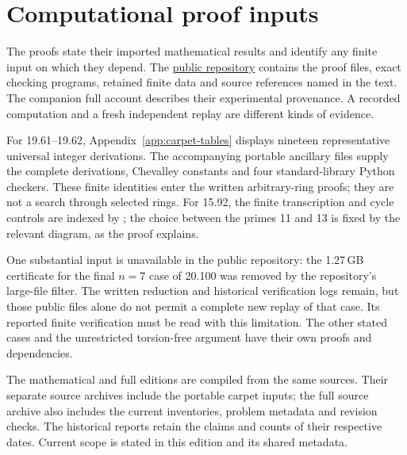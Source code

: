 \section{Computational proof inputs}
\label{app:math-artifacts}
The proofs state their imported mathematical results and identify any
finite input on which they depend. The
\href{https://github.com/JUrban/kour1}{public repository} contains the
proof files, exact checking programs, retained finite data and source
references named in the text. The companion full account describes
their experimental provenance. A recorded computation and a fresh
independent replay are different kinds of evidence.

For 19.61--19.62, Appendix~\ref{app:carpet-tables} displays nineteen
representative universal integer derivations. The accompanying portable
ancillary files supply the complete derivations, Chevalley constants and
four standard-library Python checkers. These finite identities enter the
written arbitrary-ring proofs; they are not a search through selected rings.
For 15.92, the finite transcription and cycle controls are indexed by
; the choice between the primes
11 and 13 is fixed by the relevant diagram, as the proof explains.

One substantial input is unavailable in the public repository: the
1.27\,GB certificate for the final $n=7$ case of 20.100 was removed by
the repository's large-file filter. The written reduction and historical
verification logs remain, but those public files alone do not permit a
complete new replay of that case. Its reported finite verification must
be read with this limitation. The other stated cases and the unrestricted
torsion-free argument have their own proofs and dependencies.

The mathematical and full editions are compiled from the same sources.
Their separate source archives include the portable carpet inputs;
the full source archive also includes the current inventories, problem
metadata and revision checks. The historical reports retain the claims
and counts of their respective dates. Current scope is stated in this
edition and its shared metadata.
